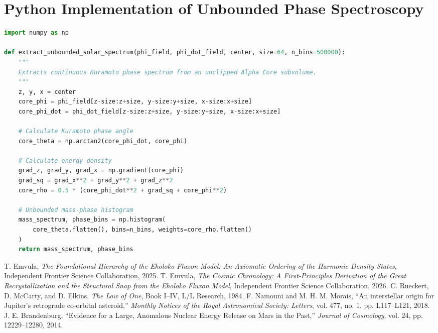 \documentclass[11pt, twoside]{article}
\begin{document}
\appendix
\section{Python Implementation of Unbounded Phase Spectroscopy}

\begin{lstlisting}[language=Python, caption={Unbounded Fisher-Phase Spectroscopic Extraction Implementation.}]
import numpy as np

def extract_unbounded_solar_spectrum(phi_field, phi_dot_field, center, size=64, n_bins=500000):
    """
    Extracts continuous Kuramoto phase spectrum from an unclipped Alpha Core subvolume.
    """
    z, y, x = center
    core_phi = phi_field[z-size:z+size, y-size:y+size, x-size:x+size]
    core_phi_dot = phi_dot_field[z-size:z+size, y-size:y+size, x-size:x+size]
    
    # Calculate Kuramoto phase angle
    core_theta = np.arctan2(core_phi_dot, core_phi)
    
    # Calculate energy density
    grad_z, grad_y, grad_x = np.gradient(core_phi)
    grad_sq = grad_x**2 + grad_y**2 + grad_z**2
    core_rho = 0.5 * (core_phi_dot**2 + grad_sq + core_phi**2)
    
    # Unbounded mass-phase histogram
    mass_spectrum, phase_bins = np.histogram(
        core_theta.flatten(), bins=n_bins, weights=core_rho.flatten()
    )
    return mass_spectrum, phase_bins
\end{lstlisting}


\begin{thebibliography}{99}
 T. Emvula, \textit{The Foundational Hierarchy of the Eholoko Fluxon Model: An Axiomatic Ordering of the Harmonic Density States}, Independent Frontier Science Collaboration, 2025.
 T. Emvula, \textit{The Cosmic Chronology: A First-Principles Derivation of the Great Recrystallization and the Structural Snap from the Eholoko Fluxon Model}, Independent Frontier Science Collaboration, 2026.
 C. Rueckert, D. McCarty, and D. Elkins, \textit{The Law of One}, Book I--IV, L/L Research, 1984.
 F. Namouni and M. H. M. Morais, ``An interstellar origin for Jupiter's retrograde co-orbital asteroid,'' \textit{Monthly Notices of the Royal Astronomical Society: Letters}, vol. 477, no. 1, pp. L117--L121, 2018.
 J. E. Brandenburg, ``Evidence for a Large, Anomalous Nuclear Energy Release on Mars in the Past,'' \textit{Journal of Cosmology}, vol. 24, pp. 12229--12280, 2014.
\end{thebibliography}
\end{document}
